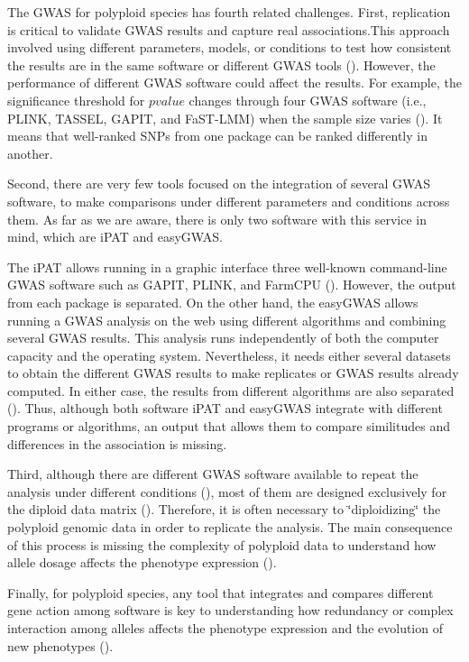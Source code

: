 \documentclass{article}
\begin{document}

The GWAS for polyploid species has fourth related challenges. First, replication is critical to validate GWAS results and capture real associations.This approach involved using different parameters, models, or conditions to test how consistent the results are in the same software or different GWAS tools (\cite{De2014,Pearson2008}). However, the performance of different GWAS software could affect the results. For example, the significance threshold for $pvalue$ changes through four GWAS software (i.e., PLINK, TASSEL, GAPIT, and FaST-LMM) when the sample size varies (\cite{Yan2019}). It means that well-ranked SNPs from one package can be ranked differently in another.

Second, there are very few tools focused on the integration of several GWAS software, to make comparisons under different parameters and conditions across them. As far as we are aware, there is only two software with this service in mind, which are iPAT and easyGWAS.

The iPAT allows running in a graphic interface three well-known command-line GWAS software such as GAPIT, PLINK, and FarmCPU (\cite{Zhang2018}). However, the output from each package is separated. On the other hand, the easyGWAS allows running a GWAS analysis on the web using different algorithms and combining several GWAS results. This analysis runs independently of both the computer capacity and the operating system. Nevertheless, it needs either several datasets to obtain the different GWAS results to make replicates or GWAS results already computed. In either case, the results from different algorithms are also separated (\cite{Grimm2017}). Thus, although both software iPAT and easyGWAS integrate with different programs or algorithms, an output that allows them to compare similitudes and differences in the association is missing.

Third, although there are different GWAS software available to repeat the analysis under different conditions (\cite{Gumpinger2018}), most of them are designed exclusively for the diploid data matrix (\cite{Bourke2018}). Therefore, it is often necessary to \char`\"{}diploidizing\char`\"{} the polyploid genomic data in order to replicate the analysis. The main consequence of this process is missing the complexity of polyploid data to understand how allele dosage affects the phenotype expression (\cite{Ferrao2018}).

Finally, for polyploid species, any tool that integrates and compares different gene action among software is key to understanding how redundancy or complex interaction among alleles affects the phenotype expression and the evolution of new phenotypes (\cite{Bourke2018,Rosyara2016,Ferrao2018}).
\end{document}

